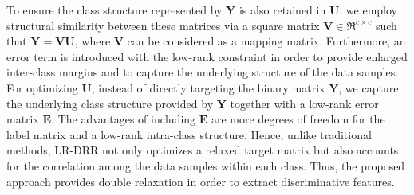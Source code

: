 To ensure the class structure represented by $\mathbf{Y}$ is also retained in $\mathbf{U}$, we employ structural similarity between these matrices via a square matrix $\mathbf{V} \in \Re^{c \times c}$ such that $\mathbf{Y} = \mathbf{V} \mathbf{U}$, where $\mathbf{V}$ can be considered as a mapping matrix. Furthermore, an error term is introduced with the low-rank constraint in order to provide enlarged inter-class margins and to capture the underlying structure of the data samples. For optimizing $\mathbf{U}$, instead of directly targeting the binary matrix $\mathbf{Y}$, we capture the underlying class structure provided by $\mathbf{Y}$ together with a low-rank error matrix $\mathbf{E}$. The advantages of including $\mathbf{E}$ are more degrees of freedom for the label matrix and a low-rank intra-class structure. Hence, unlike traditional methods, LR-DRR not only optimizes a relaxed target matrix but also accounts for the correlation among the data samples within each class. Thus, the proposed approach provides double relaxation in order to extract discriminative features. 
%
